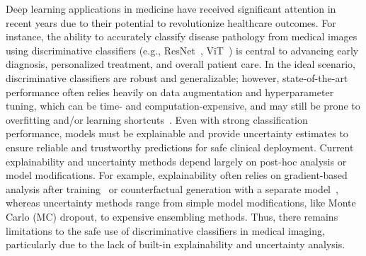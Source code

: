 Deep learning applications in medicine have received significant attention in recent years due to their potential to revolutionize healthcare outcomes. For instance, the ability to accurately classify disease pathology from medical images using discriminative classifiers (e.g., ResNet~\cite{he2015deep}, ViT~\cite{dosovitskiy2020image}) is central to advancing early diagnosis, personalized treatment, and overall patient care. %
In the ideal scenario, discriminative classifiers are robust and generalizable; however, state-of-the-art performance often relies heavily on data augmentation and hyperparameter tuning, which can be time- and computation-expensive, and may still be prone to overfitting and/or learning shortcuts~\cite{Geirhos:2020:ShortcutLearning}.
Even with strong classification performance, models must be explainable and provide uncertainty estimates to ensure reliable and trustworthy predictions for safe clinical deployment.
Current explainability and uncertainty methods depend largely on post-hoc analysis or model modifications. For example, explainability often relies on gradient-based analysis after training~\cite{gradcam} or counterfactual generation with a separate model~\cite{sun2023inherentlyinterpretablemultilabelclassification},
whereas uncertainty methods range from simple model modifications, like Monte Carlo (MC) dropout, to expensive ensembling methods. Thus, there remains limitations to the safe use of discriminative classifiers in medical imaging, particularly due to the lack of built-in explainability and uncertainty analysis.

\begin{comment}
Furthermore, the global and ever-growing adoption of deep learning in our societies has raised concerns about the increasing environmental burden of training large models~\cite{Patterson:arXiv:2021:carbonEmissionsLargeNeural}. Amidst the backdrop of remarkable advancements looms the substantial computational resources and energy required for training deep learning models. Given the escalating scale of modern architectures, research into more sustainable development practices~\cite{Sangarya:arXiv:2024:estimatingenvironmentalcostmodels}, including the repurposing of pre-trained models, is gaining traction. This approach enables researchers to build on existing computational investments rather than training new models from scratch, thereby reducing the environmental impact.
\end{comment}

